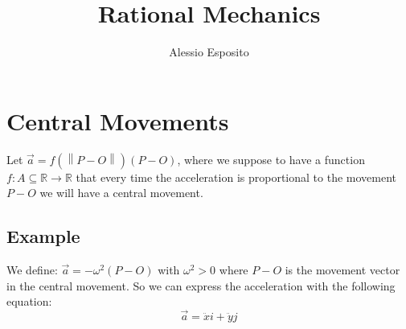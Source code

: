 \documentclass{article}
\title{Rational Mechanics}
\author{Alessio Esposito}
\begin{document}
\maketitle
    \section*{Central Movements}
        Let $\vec{a} = f(\left\lVert P - O \right\rVert) (P-O)$, where we suppose to have a function $f : A \subseteq \mathbb{R} \rightarrow \mathbb{R}$ that every time the acceleration is proportional to the movement $P - O$ we will have a central movement.\\
        
        \subsection*{Example}

        We define: $\vec{a} = - \omega ^2 (P - O)$ with $\omega^2 > 0$ where $P-O$ is the movement vector in the central movement.
        So we can express the acceleration with the following equation:
        \begin{equation*}
            \vec{a} = \ddot{x}i + \ddot{y}j
        \end{equation*}
\end{document}
